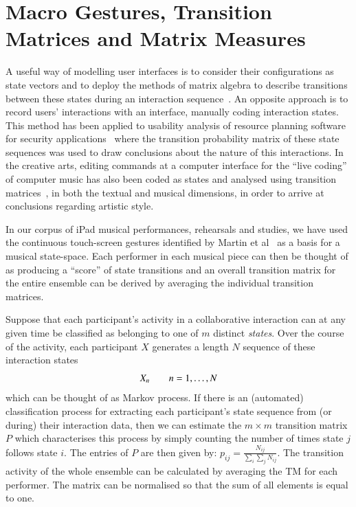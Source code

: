 \documentclass{sigchi}
\begin{document}
\section{Macro Gestures, Transition Matrices and Matrix Measures}

A useful way of modelling user interfaces is to consider their
configurations as state vectors and to deploy the methods of matrix
algebra to describe transitions between these states during an
interaction sequence~\cite{Thimbleby:2001kq, Thimbleby:2004fj}.
An opposite approach is to record users' interactions with an
interface, manually coding interaction states. 
This method has been applied to usability analysis of resource
planning software for security applications~\cite{Kannampallil:2007fp}
where the transition probability matrix of these state sequences
was used to draw conclusions about the nature of this interactions.
In the creative arts, editing commands at a computer interface for the
``live coding'' of computer music has also been coded as states and
analysed using transition matrices~\cite{Swift:2014tya}, in both the
textual and musical dimensions, in order to arrive at conclusions
regarding artistic style.

In our corpus of iPad musical performances, rehearsals and studies, we
have used the continuous touch-screen gestures identified by Martin et
al~\cite{Martin:2014cr} as a basis for a musical state-space.
Each performer in each musical piece can then be thought of as
producing a ``score'' of state transitions and an overall transition
matrix for the entire ensemble can be derived by averaging the
individual transition matrices.

Suppose that each participant's activity in a collaborative
interaction can at any given time be classified as belonging to one of
$m$ distinct \emph{states}. Over the course of the activity, each
participant $X$ generates a length $N$ sequence of these interaction
states
\begin{equation}
 X_n \hskip 2em n = 1, \ldots, N
\end{equation}
which can be thought of as Markov process. If there is an (automated)
classification process for extracting each participant's state
sequence from (or during) their interaction data, then we can estimate
the $m \times m$ transition matrix $P$ which characterises this
process by simply counting the number of times state $j$ follows state
$i$. The entries of $P$ are then given by:
$p_{ij} = \frac{N_{ij}}{\sum_i \sum_j N_{ij}}$.
The transition activity of the whole ensemble can be calculated by
averaging the TM for each performer. The matrix can be normalised so
that the sum of all elements is equal to one.
\end{document}
